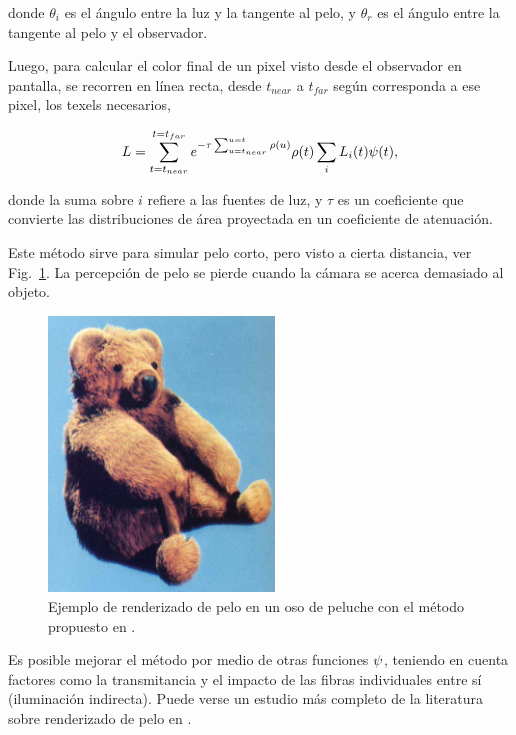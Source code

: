 donde $\theta_{i}$ es el ángulo entre la luz y la tangente al pelo, y $\theta_{r}$ es el ángulo entre la tangente al pelo y el observador.

Luego, para calcular el color final de un pixel visto desde el observador en pantalla, se recorren en línea recta, desde $t_{near}$ a $t_{far}$ según corresponda a ese pixel, los texels necesarios,

$$L = \sum_{t=t_{near}}^{t=t_{far}} {e^{-\tau \sum_{u=t_{near}}^{u=t} \rho(u)} \rho(t) \sum_{i} L_{i}(t) \bold{\psi}(t)},$$

donde la suma sobre $i$ refiere a las fuentes de luz, y $\tau$ es un coeficiente que convierte las distribuciones de área proyectada en un coeficiente de atenuación.

Este método sirve para simular pelo corto, pero visto a cierta distancia, ver Fig.~\ref{fg:osopelo}.
La percepción de pelo se pierde cuando la cámara se acerca demasiado al objeto.

\begin{figure}
\center
\includegraphics[width=6cm]{figures/osopelo}
\caption[Renderizado de pelo en un oso de peluche]{Ejemplo de renderizado de pelo en un oso de peluche con el método propuesto en \cite{Kajiya1989}.}
\label{fg:osopelo}
\end{figure}


Es posible mejorar el método por medio de otras funciones $\bold{\psi}$, teniendo en cuenta factores como la transmitancia y el impacto de las fibras individuales entre sí (iluminación indirecta).
Puede verse un estudio más completo de la literatura sobre renderizado de pelo en \cite{Ward2007}.


